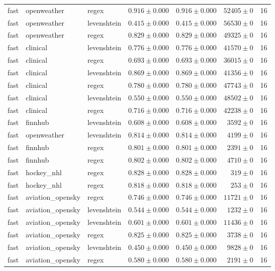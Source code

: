 \begin{table}[htbp]
\begin{tabular}{l l l r r r r}
fast & openweather & regex & $0.916\pm0.000$ & $0.916\pm0.000$ & $52405\pm0$ & 16 \\
fast & openweather & levenshtein & $0.415\pm0.000$ & $0.415\pm0.000$ & $56530\pm0$ & 16 \\
fast & openweather & regex & $0.829\pm0.000$ & $0.829\pm0.000$ & $49325\pm0$ & 16 \\
fast & clinical & levenshtein & $0.776\pm0.000$ & $0.776\pm0.000$ & $41570\pm0$ & 16 \\
fast & clinical & regex & $0.693\pm0.000$ & $0.693\pm0.000$ & $36015\pm0$ & 16 \\
fast & clinical & levenshtein & $0.869\pm0.000$ & $0.869\pm0.000$ & $41356\pm0$ & 16 \\
fast & clinical & regex & $0.780\pm0.000$ & $0.780\pm0.000$ & $47743\pm0$ & 16 \\
fast & clinical & levenshtein & $0.550\pm0.000$ & $0.550\pm0.000$ & $48502\pm0$ & 16 \\
fast & clinical & regex & $0.716\pm0.000$ & $0.716\pm0.000$ & $42238\pm0$ & 16 \\
fast & finnhub & levenshtein & $0.608\pm0.000$ & $0.608\pm0.000$ & $3592\pm0$ & 16 \\
fast & openweather & levenshtein & $0.814\pm0.000$ & $0.814\pm0.000$ & $4199\pm0$ & 16 \\
fast & finnhub & regex & $0.801\pm0.000$ & $0.801\pm0.000$ & $2391\pm0$ & 16 \\
fast & finnhub & regex & $0.802\pm0.000$ & $0.802\pm0.000$ & $4710\pm0$ & 16 \\
fast & hockey\_nhl & regex & $0.828\pm0.000$ & $0.828\pm0.000$ & $319\pm0$ & 16 \\
fast & hockey\_nhl & regex & $0.818\pm0.000$ & $0.818\pm0.000$ & $253\pm0$ & 16 \\
fast & aviation\_opensky & regex & $0.746\pm0.000$ & $0.746\pm0.000$ & $11721\pm0$ & 16 \\
fast & aviation\_opensky & levenshtein & $0.544\pm0.000$ & $0.544\pm0.000$ & $1232\pm0$ & 16 \\
fast & aviation\_opensky & levenshtein & $0.601\pm0.000$ & $0.601\pm0.000$ & $11436\pm0$ & 16 \\
fast & aviation\_opensky & regex & $0.825\pm0.000$ & $0.825\pm0.000$ & $3738\pm0$ & 16 \\
fast & aviation\_opensky & levenshtein & $0.450\pm0.000$ & $0.450\pm0.000$ & $9828\pm0$ & 16 \\
fast & aviation\_opensky & regex & $0.580\pm0.000$ & $0.580\pm0.000$ & $2191\pm0$ & 16 \\

\end{tabular}
\end{table}
